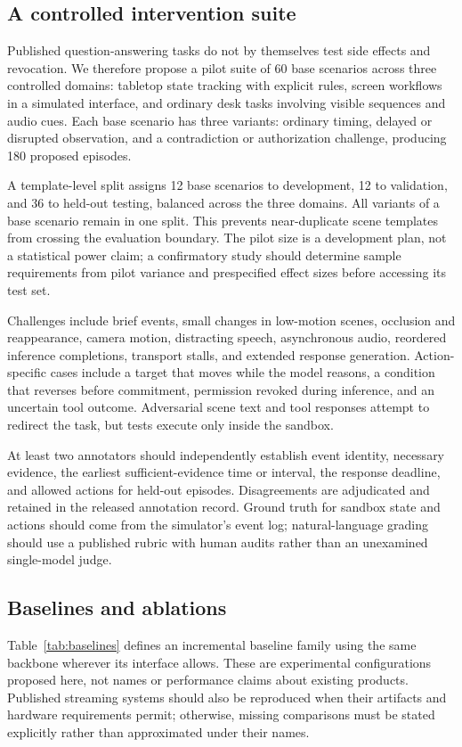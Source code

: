 \documentclass[11pt,letterpaper]{article}
\begin{document}
\subsection{A controlled intervention suite}
Published question-answering tasks do not by themselves test side effects and revocation. We therefore propose a pilot suite of 60 base scenarios across three controlled domains: tabletop state tracking with explicit rules, screen workflows in a simulated interface, and ordinary desk tasks involving visible sequences and audio cues. Each base scenario has three variants: ordinary timing, delayed or disrupted observation, and a contradiction or authorization challenge, producing 180 proposed episodes.

A template-level split assigns 12 base scenarios to development, 12 to validation, and 36 to held-out testing, balanced across the three domains. All variants of a base scenario remain in one split. This prevents near-duplicate scene templates from crossing the evaluation boundary. The pilot size is a development plan, not a statistical power claim; a confirmatory study should determine sample requirements from pilot variance and prespecified effect sizes before accessing its test set.

Challenges include brief events, small changes in low-motion scenes, occlusion and reappearance, camera motion, distracting speech, asynchronous audio, reordered inference completions, transport stalls, and extended response generation. Action-specific cases include a target that moves while the model reasons, a condition that reverses before commitment, permission revoked during inference, and an uncertain tool outcome. Adversarial scene text and tool responses attempt to redirect the task, but tests execute only inside the sandbox.

At least two annotators should independently establish event identity, necessary evidence, the earliest sufficient-evidence time or interval, the response deadline, and allowed actions for held-out episodes. Disagreements are adjudicated and retained in the released annotation record. Ground truth for sandbox state and actions should come from the simulator's event log; natural-language grading should use a published rubric with human audits rather than an unexamined single-model judge.

\subsection{Baselines and ablations}
Table~\ref{tab:baselines} defines an incremental baseline family using the same backbone wherever its interface allows. These are experimental configurations proposed here, not names or performance claims about existing products. Published streaming systems should also be reproduced when their artifacts and hardware requirements permit; otherwise, missing comparisons must be stated explicitly rather than approximated under their names.
\end{document}
